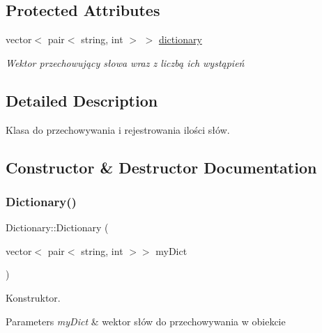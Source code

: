 \subsection*{Protected Attributes}
\begin{DoxyCompactItemize}
\item 
\mbox{\label{class_dictionary_a187d092adc1ef7bdf396219ecde72f24}} 
vector$<$ pair$<$ string, int $>$ $>$ \mbox{\hyperlink{class_dictionary_a187d092adc1ef7bdf396219ecde72f24}{dictionary}}
\begin{DoxyCompactList}\small\item\em Wektor przechowujący słowa wraz z liczbą ich wystąpień \end{DoxyCompactList}\end{DoxyCompactItemize}


\subsection{Detailed Description}
Klasa do przechowywania i rejestrowania ilości słów. 

\subsection{Constructor \& Destructor Documentation}
\mbox{\label{class_dictionary_aa162f77ffd281cebb669e6cdd3961524}} 
\subsubsection{\texorpdfstring{Dictionary()}{Dictionary()}}
{\footnotesize\ttfamily Dictionary\+::\+Dictionary (\begin{DoxyParamCaption}\item[{vector$<$ pair$<$ string, int $>$$>$}]{my\+Dict }\end{DoxyParamCaption})\hspace{0.3cm}{\ttfamily [inline]}}



Konstruktor. 


\begin{DoxyParams}{Parameters}
{\em my\+Dict} & wektor słów do przechowywania w obiekcie \\
\hline
\end{DoxyParams}


